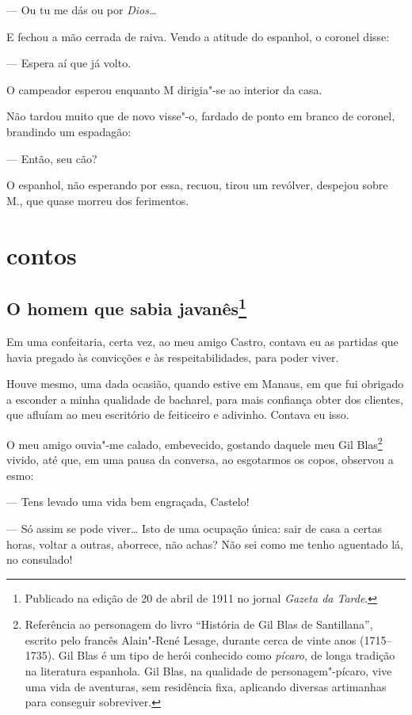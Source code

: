 --- Ou tu me dás ou por \emph{Dios\ldots{}}

E fechou a mão cerrada de raiva. Vendo a atitude do espanhol, o coronel
disse:

--- Espera aí que já volto.

O campeador esperou enquanto M dirigia"-se ao interior da casa.

Não tardou muito que de novo visse"-o, fardado de ponto em branco de
coronel, brandindo um espadagão:

--- Então, seu cão?

O espanhol, não esperando por essa, recuou, tirou um revólver, despejou
sobre M., que quase morreu dos ferimentos.



\part{contos}


\chapter[O homem que sabia javanês]{O homem que sabia javanês\footnote[*]{Publicado na edição de 20 de abril de 1911 no jornal \emph{Gazeta da Tarde}.}}

Em uma confeitaria, certa vez, ao meu amigo Castro, contava eu as
partidas que havia pregado às convicções e às respeitabilidades, para
poder viver.

Houve mesmo, uma dada ocasião, quando estive em Manaus, em que fui
obrigado a esconder a minha qualidade de bacharel, para mais confiança
obter dos clientes, que afluíam ao meu escritório de feiticeiro e
adivinho. Contava eu isso.

O meu amigo ouvia"-me calado, embevecido, gostando daquele meu Gil
Blas\footnote{Referência ao personagem do livro ``História de Gil Blas
  de Santillana'', escrito pelo francês Alain"-René Lesage, durante cerca
  de vinte anos (1715--1735). Gil Blas é um tipo de herói conhecido
  como \emph{pícaro}, de longa tradição na literatura espanhola. Gil
  Blas, na qualidade de personagem"-pícaro, vive uma vida de aventuras,
  sem residência fixa, aplicando diversas artimanhas para conseguir
  sobreviver.} vivido, até que, em uma pausa da conversa, ao esgotarmos
os copos, observou a esmo:

--- Tens levado uma vida bem engraçada, Castelo!

--- Só assim se pode viver\ldots{} Isto de uma ocupação única: sair de casa a
certas horas, voltar a outras, aborrece, não achas? Não sei como me
tenho aguentado lá, no consulado!

